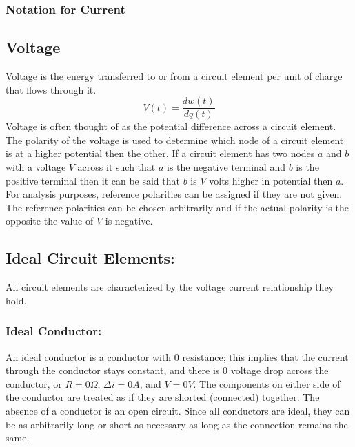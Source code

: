 \documentclass[14pt]{article}
\begin{document}
    \subsubsection{Notation for Current}
    \subsection{Voltage}
    Voltage is the energy transferred to or from a circuit element per unit of charge that flows through it. 
    $$V(t)=\frac{dw(t)}{dq(t)}$$
    Voltage is often thought of as the potential difference across a circuit element. The polarity of the voltage is used to determine which node of a circuit element is at a higher potential then the other. If a circuit element has two nodes $a$ and $b$ with a voltage $V$ across it such that $a$ is the negative terminal and $b$ is the positive terminal then it can be said that $b$ is $V$ volts higher in potential then $a$. For analysis purposes, reference polarities can be assigned if they are not given. The reference polarities can be chosen arbitrarily and if the actual polarity is the opposite the value of $V$ is negative. 
    \subsection{Ideal Circuit Elements:}
    All circuit elements are characterized by the voltage current relationship they hold.
    \subsubsection{Ideal Conductor:}
    An ideal conductor is a conductor with $0$ resistance; this implies that the current through the conductor stays constant, and there is $0$ voltage drop across the conductor, or $R=0\Omega$, $\Delta i=0A$, and $V=0V$. The components on either side of the conductor are treated as if they are shorted (connected) together. The absence of a conductor is an open circuit. Since all conductors are ideal, they can be as arbitrarily long or short as necessary as long as the connection remains the same. 
\end{document}
